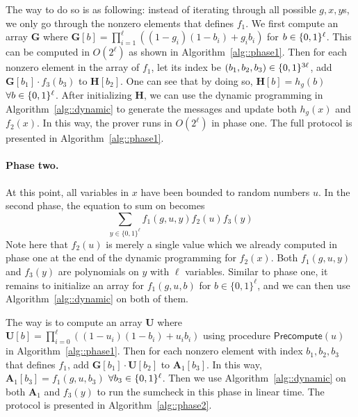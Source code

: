 The way to do so is as following: instead of iterating through all possible $g,x,y$s, we only go through the nonzero elements that defines $f_1$. We first compute an array \textbf{G} where $\textbf{G}[b] = \prod_{i=1}^\ell ((1-g_i)(1-b_i)+g_ib_i)$ for $b\in\{0,1\}^\ell$. This can be computed in $O(2^\ell)$ as shown in Algorithm~\ref{alg::phase1}. Then for each nonzero element in the array of $f_1$, let its index be $(b_1,b_2,b_3) \in\{0,1\}^{3\ell}$, add $\textbf{G}[b_1]\cdot f_3(b_3)$ to $\textbf{H}[b_2]$. One can see that by doing so, $\textbf{H}[b] = h_g(b)$ $\forall b\in\{0,1\}^\ell$. After initializing $\textbf{H}$, we can use the dynamic programming in Algorithm~\ref{alg::dynamic} to generate the messages and update both $h_g(x)$ and $f_2(x)$. In this way, the prover runs in $O(2^\ell)$ in phase one. The full protocol is presented in Algorithm~\ref{alg::phase1}.


\paragraph{Phase two.} At this point, all variables in $x$ have been bounded to random numbers $u$. In the second phase, the equation to sum on becomes 
\[
\sum_{y\in\{0,1\}^\ell}f_1(g,u,y)f_2(u)f_3(y)
\]
Note here that $f_2(u)$ is merely a single value which we already computed in phase one at the end of the dynamic programming for $f_2(x)$. Both $f_1(g,u,y)$ and $f_3(y)$ are polynomials on $y$ with $\ell$ variables. Similar to phase one, it remains to initialize an array for $f_1(g,u,b)$ for $b\in\{0,1\}^\ell$, and we can then use Algorithm~\ref{alg::dynamic} on both of them.

The way is to compute an array \textbf{U} where $\textbf{U}[b] = \prod_{i=0}^\ell ((1-u_i)(1-b_i)+u_ib_i)$ using procedure $\mathsf{Precompute}(u)$ in Algorithm~\ref{alg::phase1}. Then for each nonzero element with index $b_1,b_2,b_3$ that defines $f_1$, add $\textbf{G}[b_1]\cdot\textbf{U}[b_2]$ to $\textbf{A}_1[b_3]$. In this way, $\textbf{A}_1[b_3]=f_1(g,u,b_3)$ $\forall b_3\in\{0,1\}^\ell$. Then we use Algorithm~\ref{alg::dynamic} on both $\textbf{A}_1$ and $f_3(y)$ to run the sumcheck in this phase in linear time. The protocol is presented in Algorithm~\ref{alg::phase2}.


